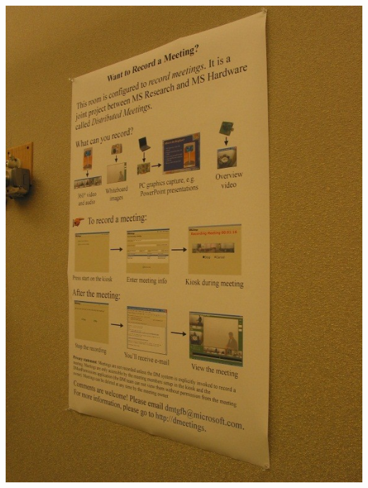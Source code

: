 \documentclass[]{article}
\begin{document}
			\includegraphics{images/WhiteboardIt.jpg}
\end{document}
